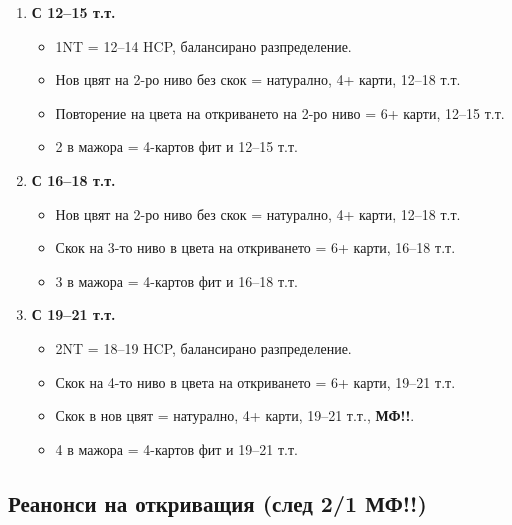 \documentclass[10pt,a5paper]{extarticle}
\begin{document}
\begin{enumerate}
    \item \textbf{С 12–15 т.т.}
        \begin{itemize}
            \item[] 1NT = 12–14 HCP, балансирано разпределение.
            \item[] Нов цвят на 2-ро ниво без скок = натурално, 4+ карти, 12–18 т.т.
            \item[] Повторение на цвета на откриването на 2-ро ниво = 6+ карти, 12–15 т.т.
            \item[] 2 в мажора = 4-картов фит и 12–15 т.т.
        \end{itemize}

    \item \textbf{С 16–18 т.т.}
        \begin{itemize}
            \item[] Нов цвят на 2-ро ниво без скок = натурално, 4+ карти, 12–18 т.т.
            \item[] Скок на 3-то ниво в цвета на откриването = 6+ карти, 16–18 т.т.
            \item[] 3 в мажора = 4-картов фит и 16–18 т.т.
        \end{itemize}

    \item \textbf{С 19–21 т.т.}
        \begin{itemize}
            \item[] 2NT = 18–19 HCP, балансирано разпределение.
            \item[] Скок на 4-то ниво в цвета на откриването = 6+ карти, 19–21 т.т.
            \item[] Скок в нов цвят = натурално, 4+ карти, 19–21 т.т., \textbf{МФ!!}.
            \item[] 4 в мажора = 4-картов фит и 19–21 т.т.
        \end{itemize}
\end{enumerate}

\subsection*{Реанонси на откриващия (след 2/1 МФ!!)}
\end{document}
